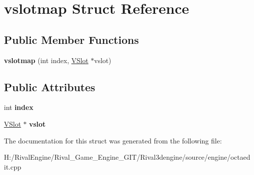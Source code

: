\hypertarget{structvslotmap}{}\section{vslotmap Struct Reference}
\label{structvslotmap}
\subsection*{Public Member Functions}
\begin{DoxyCompactItemize}
\item 
\mbox{\label{structvslotmap_a14e8ae03eb1ee897fac19ff98a18689b}} 
{\bfseries vslotmap} (int index, \hyperlink{struct_v_slot}{V\+Slot} $\ast$vslot)
\end{DoxyCompactItemize}
\subsection*{Public Attributes}
\begin{DoxyCompactItemize}
\item 
\mbox{\label{structvslotmap_a0684c33f5f2ffeb7e6b52fad6302c5bd}} 
int {\bfseries index}
\item 
\mbox{\label{structvslotmap_a65c6970ff478ae6aaca5cca8e9516a7a}} 
\hyperlink{struct_v_slot}{V\+Slot} $\ast$ {\bfseries vslot}
\end{DoxyCompactItemize}


The documentation for this struct was generated from the following file\+:\begin{DoxyCompactItemize}
\item 
H\+:/\+Rival\+Engine/\+Rival\+\_\+\+Game\+\_\+\+Engine\+\_\+\+G\+I\+T/\+Rival3dengine/source/engine/octaedit.\+cpp\end{DoxyCompactItemize}
